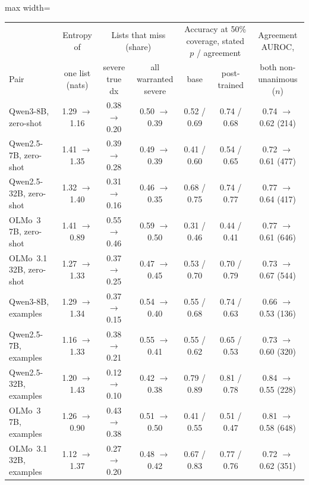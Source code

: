 \documentclass[11pt]{article}
\begin{document}
\begin{table}[t]
\centering\small
\begin{adjustbox}{max width=\linewidth}
\begin{tabular}{lcccccc}
\toprule
 & Entropy of & \multicolumn{2}{c}{Lists that miss (share)} & \multicolumn{2}{c}{Accuracy at 50\% coverage, stated $p$ / agreement} & Agreement AUROC, \\
Pair & one list (nats) & severe true dx & all warranted severe & base & post-trained & both non-unanimous ($n$) \\
\midrule
Qwen3-8B, zero-shot & 1.29 $\rightarrow$ 1.16 & 0.38 $\rightarrow$ 0.20 & 0.50 $\rightarrow$ 0.39 & 0.52 / 0.69 & 0.74 / 0.68 & 0.74 $\rightarrow$ 0.62 (214) \\
Qwen2.5-7B, zero-shot & 1.41 $\rightarrow$ 1.35 & 0.39 $\rightarrow$ 0.28 & 0.49 $\rightarrow$ 0.39 & 0.41 / 0.60 & 0.54 / 0.65 & 0.72 $\rightarrow$ 0.61 (477) \\
Qwen2.5-32B, zero-shot & 1.32 $\rightarrow$ 1.40 & 0.31 $\rightarrow$ 0.16 & 0.46 $\rightarrow$ 0.35 & 0.68 / 0.75 & 0.74 / 0.77 & 0.77 $\rightarrow$ 0.64 (417) \\
OLMo~3 7B, zero-shot & 1.41 $\rightarrow$ 0.89 & 0.55 $\rightarrow$ 0.46 & 0.59 $\rightarrow$ 0.50 & 0.31 / 0.46 & 0.44 / 0.41 & 0.77 $\rightarrow$ 0.61 (646) \\
OLMo~3.1 32B, zero-shot & 1.27 $\rightarrow$ 1.33 & 0.37 $\rightarrow$ 0.25 & 0.47 $\rightarrow$ 0.45 & 0.53 / 0.70 & 0.70 / 0.79 & 0.73 $\rightarrow$ 0.67 (544) \\
\midrule
Qwen3-8B, examples & 1.29 $\rightarrow$ 1.34 & 0.37 $\rightarrow$ 0.15 & 0.54 $\rightarrow$ 0.40 & 0.55 / 0.68 & 0.74 / 0.63 & 0.66 $\rightarrow$ 0.53 (136) \\
Qwen2.5-7B, examples & 1.16 $\rightarrow$ 1.33 & 0.38 $\rightarrow$ 0.21 & 0.55 $\rightarrow$ 0.41 & 0.55 / 0.62 & 0.65 / 0.53 & 0.73 $\rightarrow$ 0.60 (320) \\
Qwen2.5-32B, examples & 1.20 $\rightarrow$ 1.43 & 0.12 $\rightarrow$ 0.10 & 0.42 $\rightarrow$ 0.38 & 0.79 / 0.89 & 0.81 / 0.78 & 0.84 $\rightarrow$ 0.55 (228) \\
OLMo~3 7B, examples & 1.26 $\rightarrow$ 0.90 & 0.43 $\rightarrow$ 0.38 & 0.51 $\rightarrow$ 0.50 & 0.41 / 0.55 & 0.51 / 0.47 & 0.81 $\rightarrow$ 0.58 (648) \\
OLMo~3.1 32B, examples & 1.12 $\rightarrow$ 1.37 & 0.27 $\rightarrow$ 0.20 & 0.48 $\rightarrow$ 0.42 & 0.67 / 0.83 & 0.77 / 0.76 & 0.72 $\rightarrow$ 0.62 (351) \\

\end{tabular}
\end{adjustbox}
\end{table}
\end{document}
